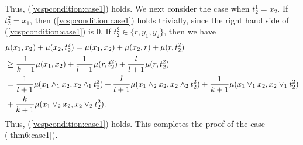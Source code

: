 \documentclass[11pt]{article}
\theoremstyle{definition}
\begin{document}
Thus, (\ref{vcspcondition:case1}) holds. We next consider the case when $t_2^1=x_2$. If $t_2^2=x_1$, then (\ref{vcspcondition:case1}) holds trivially, since the right hand side of (\ref{vcspcondition:case1}) is 0. If $t_2^2\in \{r,y_1,y_2\}$, then we have
\begin{align}
    &\mu(x_1,x_2)+\mu(x_2,t_2^2)=\mu(x_1,x_2)+\mu(x_2,r)+\mu(r,t_2^2)\notag\\
    &\geq \frac{1}{k+1}\mu(x_1,x_2)+\frac{1}{l+1} \mu(r,t_2^2)+\frac{l}{l+1} \mu(r,t_2^2)\notag\\
    &=\frac{1}{l+1} \mu(x_1\wedge_1 x_2,x_2\wedge_1 t_2^2)+\frac{l}{l+1} \mu(x_1\wedge_2 x_2,x_2\wedge_2 t_2^2)+\frac{1}{k+1} \mu(x_1\vee_1 x_2,x_2\vee_1 t_2^2)\notag\\
    &+\frac{k}{k+1} \mu(x_1\vee_2 x_2,x_2\vee_2 t_2^2).
\end{align}
Thus, (\ref{vcspcondition:case1}) holds. This completes the proof of the case (\ref{thm6:case1}).
\end{document}
